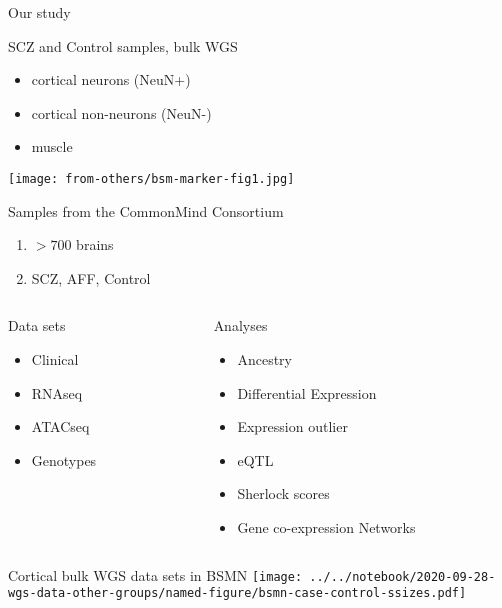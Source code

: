\documentclass[usenames,dvipsnames]{beamer}
\begin{document}

\begin{frame}{Our study}
\item SCZ and Control samples, bulk WGS
	\begin{itemize}
		\item cortical neurons (NeuN+)
                \item cortical non-neurons (NeuN-)
                \item muscle
	\end{itemize}
\texttt{[image: from-others/bsm-marker-fig1.jpg]}
\end{frame}

\begin{frame}{Samples from the CommonMind Consortium}
\begin{enumerate}
\item \(> 700\) brains
\item SCZ, AFF, Control
\end{enumerate}
\vfill
\begin{columns}[t]
\begin{column}{0.5\textwidth}
Data sets
\begin{itemize}
\item Clinical
\item RNAseq
\item ATACseq
\item Genotypes
\end{itemize}
\end{column}

\begin{column}{0.5\textwidth}
Analyses
\begin{itemize}
\item Ancestry
\item Differential Expression
\item Expression outlier
\item eQTL
\item Sherlock scores
\item Gene co-expression Networks
\end{itemize}
\end{column}
\end{columns}

\end{frame}

\begin{frame}{Cortical bulk WGS data sets in BSMN}
\texttt{[image: ../../notebook/2020-09-28-wgs-data-other-groups/named-figure/bsmn-case-control-ssizes.pdf]}
\end{frame}
\end{document}
